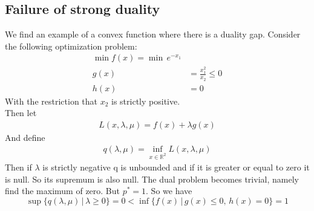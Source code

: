 \documentclass{article}
\begin{document}
	\subsection{Failure of strong duality}
	We find an example of a convex function where there is a duality gap. Consider the following optimization problem:
	\begin{align*}
		\min f(x) = \min \, e^{-x_1} \\[2ex]
		g(x) &= \frac{x_1^2}{x_2} \leq 0\\
		h(x) &= 0
	\end{align*}
	With the restriction that $x_2$ is strictly positive.\\
	Then let 
	\begin{align*}
		L(x,\lambda,\mu) = f(x)+ \lambda g(x)
	\end{align*}
	And define 
	\begin{align*}
		q(\lambda,\mu) = \inf_{x\in \mathbb{R}^2}L(x,\lambda,\mu)
	\end{align*}
	Then if $\lambda$ is strictly negative q is unbounded and if it is greater or equal to zero it is null. So its supremum is also null. The dual problem becomes trivial, namely find the maximum of zero. But $p^*=1$. So we have
	\begin{equation}
		\sup \{q(\lambda,\mu) \, \vert \, \lambda \geq  0 \} = 0 < \inf \{f(x) \, \vert \, g(x) \leq 0, \, h(x) = 0  \} = 1
	\end{equation}
	
	
	
	
	
	
	
	
	
	
	
	
	
	
	
	
	
	
\end{document}
